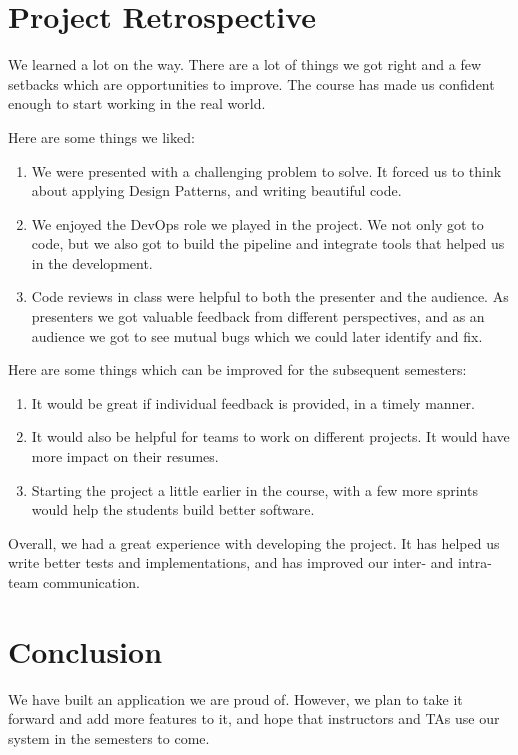\documentclass[12pt]{article}
\begin{document}
\section{Project Retrospective}
We learned a lot on the way. There are a lot of things we got right and a few setbacks which are opportunities to improve. The course has made us confident enough to start working in the real world.  \par Here are some things we liked:
\begin{enumerate}
  \item We were presented with a challenging problem to solve. It forced us to think about applying Design Patterns, and writing beautiful code. 
  \item We enjoyed the DevOps role we played in the project. We not only got to code, but we also got to build the pipeline and integrate tools that helped us in the development. 
  \item Code reviews in class were helpful to both the presenter and the audience. As presenters we got valuable feedback from different perspectives, and as an audience we got to see mutual bugs which we could later identify and fix. 
\end{enumerate}
\par Here are some things which can be improved for the subsequent semesters: 
\begin{enumerate}
  \item It would be great if individual feedback is provided, in a timely manner. 
  \item It would also be helpful for teams to work on different projects. It would have more impact on their resumes.
  \item Starting the project a little earlier in the course, with a few more sprints would help the students build better software.
\end{enumerate}

\par Overall, we had a great experience with developing the project. It has helped us write better tests and implementations, and has improved our inter- and intra-team communication. 
\section{Conclusion}
We have built an application we are proud of. However, we plan to take it forward and add more features to it, and hope that instructors and TAs use our system in the semesters to come. 
\end{document}
